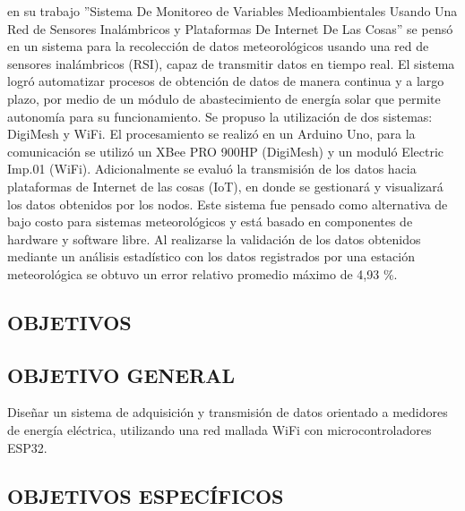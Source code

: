 \documentclass[12pt,letterpaper]{article}
\begin{document}
\cite{QCGJ2018} en su trabajo ”Sistema De Monitoreo de Variables Medioambientales Usando Una Red de Sensores Inalámbricos y Plataformas De Internet De Las Cosas” se pensó en un sistema para la recolección de datos meteorológicos usando una red de sensores inalámbricos (RSI), capaz de transmitir datos en tiempo real. El sistema logró automatizar procesos de obtención de datos de manera continua y a largo plazo, por medio de un módulo de abastecimiento de energía solar que permite autonomía para su funcionamiento. Se propuso la utilización de dos sistemas: DigiMesh y WiFi. El procesamiento se realizó en un Arduino Uno, para la comunicación se utilizó un XBee PRO 900HP (DigiMesh) y un moduló Electric Imp.01 (WiFi). Adicionalmente se evaluó la transmisión de los datos hacia plataformas de Internet de las cosas (IoT), en donde se gestionará y visualizará los datos obtenidos por los nodos. Este sistema fue pensado como alternativa de bajo costo para sistemas meteorológicos y está basado en componentes de hardware y software libre. Al realizarse la validación de los datos obtenidos mediante un análisis estadístico con los datos registrados por una estación meteorológica se obtuvo un error relativo promedio máximo de 4,93 \%.\\








 \newpage


 \begin{center}
 	\section*{OBJETIVOS}
 \end{center}

\vspace{1cm}

\subsection*{OBJETIVO GENERAL}

Diseñar un sistema de adquisición y transmisión de datos orientado a medidores de energía eléctrica, utilizando una red mallada WiFi con microcontroladores ESP32.

\subsection*{OBJETIVOS ESPECÍFICOS}
\end{document}
